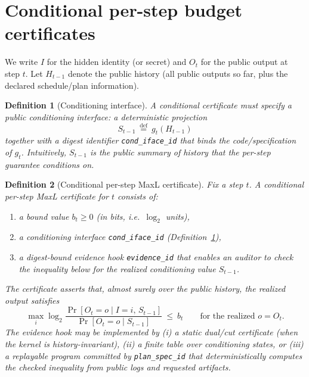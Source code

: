 \documentclass[11pt]{article}
\newtheorem{definition}{Definition}
\newcommand{\defeq}{\stackrel{\mathrm{def}}{=}}
\begin{document}
\section{Conditional per-step budget certificates}
We write $I$ for the hidden identity (or secret) and $O_t$ for the public output at step $t$.
Let $H_{t-1}$ denote the public history (all public outputs so far, plus the declared schedule/plan information).

\begin{definition}[Conditioning interface]\label{def:conditioning}
A conditional certificate must specify a public \emph{conditioning interface}:
a deterministic projection
\[
S_{t-1}\ \defeq\ g_t(H_{t-1})
\]
together with a digest identifier \texttt{cond\_iface\_id} that binds the code/specification of $g_t$.
Intuitively, $S_{t-1}$ is the public summary of history that the per-step guarantee conditions on.
\end{definition}

\begin{definition}[Conditional per-step MaxL certificate]\label{def:cps}
Fix a step $t$.
A \emph{conditional per-step MaxL certificate} for $t$ consists of:
\begin{enumerate}[leftmargin=*]
\item a bound value $b_t\ge 0$ (in \emph{bits}, i.e.\ $\log_2$ units),
\item a conditioning interface \texttt{cond\_iface\_id} (Definition~\ref{def:conditioning}),
\item a digest-bound \emph{evidence hook} \texttt{evidence\_id} that enables an auditor to check the inequality below for the realized conditioning value $S_{t-1}$.
\end{enumerate}
The certificate asserts that, almost surely over the public history, the realized output satisfies
\begin{equation}\label{eq:condmaxl}
\max_i \log_2 \frac{\Pr[O_t=o\mid I=i,\,S_{t-1}]}{\Pr[O_t=o\mid S_{t-1}]}\ \le\ b_t
\qquad\text{for the realized }o=O_t.
\end{equation}
The evidence hook may be implemented by (i) a static dual/cut certificate (when the kernel is history-invariant),
(ii) a finite table over conditioning states, or (iii) a replayable program committed by \texttt{plan\_spec\_id} that deterministically computes the checked inequality from public logs and requested artifacts.
\end{definition}
\end{document}
